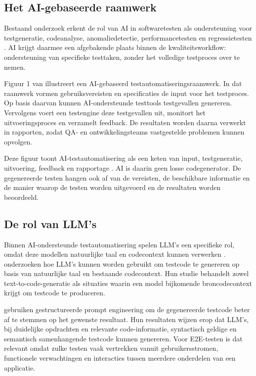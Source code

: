 \subsection{Het AI-gebaseerde raamwerk}

Bestaand onderzoek erkent de rol van AI in softwaretesten als ondersteuning voor testgeneratie, codeanalyse, anomaliedetectie, performancetesten en regressietesten \autocite{Raju2025}. AI krijgt daarmee een afgebakende plaats binnen de kwaliteitsworkflow: ondersteuning van specifieke testtaken, zonder het volledige testproces over te nemen.

Figuur 1 van \textcite{Raju2025} illustreert een AI-gebaseerd testautomatiseringsraamwerk. In dat raamwerk vormen gebruiksvereisten en specificaties de input voor het testproces. Op basis daarvan kunnen AI-ondersteunde testtools testgevallen genereren. Vervolgens voert een testengine deze testgevallen uit, monitort het uitvoeringsproces en verzamelt feedback. De resultaten worden daarna verwerkt in rapporten, zodat QA- en ontwikkelingsteams vastgestelde problemen kunnen opvolgen.

Deze figuur toont AI-testautomatisering als een keten van input, testgeneratie, uitvoering, feedback en rapportage \autocite{Raju2025}. AI is daarin geen losse codegenerator. De gegenereerde testen hangen ook af van de vereisten, de beschikbare informatie en de manier waarop de testen worden uitgevoerd en de resultaten worden beoordeeld.

\subsection{De rol van LLM's}

Binnen AI-ondersteunde testautomatisering spelen LLM's een specifieke rol, omdat deze modellen natuurlijke taal en codecontext kunnen verwerken \autocite{SaezIznaga2025}. \textcite{SaezIznaga2025} onderzoeken hoe LLM's kunnen worden gebruikt om testcode te genereren op basis van natuurlijke taal en bestaande codecontext. Hun studie behandelt zowel text-to-code-generatie als situaties waarin een model bijkomende broncodecontext krijgt om testcode te produceren.

\textcite{SaezIznaga2025} gebruiken gestructureerde prompt engineering om de gegenereerde testcode beter af te stemmen op het gewenste resultaat. Hun resultaten wijzen erop dat LLM's, bij duidelijke opdrachten en relevante code-informatie, syntactisch geldige en semantisch samenhangende testcode kunnen genereren. Voor E2E-testen is dat relevant omdat zulke testen vaak vertrekken vanuit gebruikersstromen, functionele verwachtingen en interacties tussen meerdere onderdelen van een applicatie.

